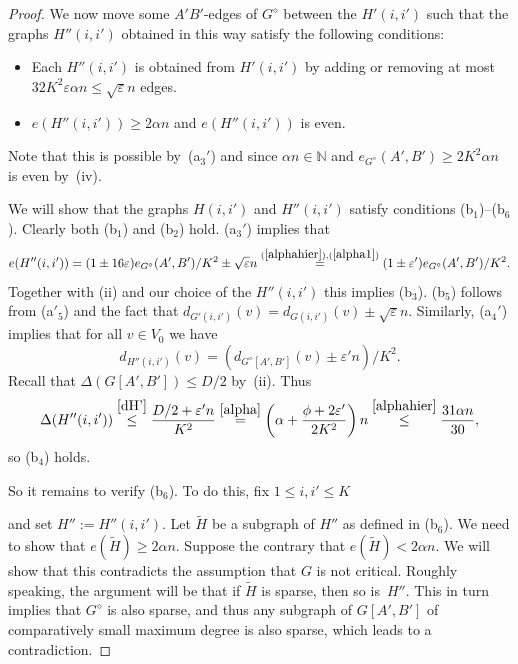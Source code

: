 \documentclass{memo-l}
\def\COMMENT#1{}
\def\eps{\varepsilon}
\numberwithin{section}{chapter}
\numberwithin{equation}{section}
\numberwithin{firstthm}{section}
\numberwithin{figure}{section}
\begin{document}
{\begin{proof}
We now move some $A'B'$-edges of $G^\diamond$ between the $H'(i,i')$ such that the graphs $H''(i,i')$
obtained in this way satisfy the following conditions:
\begin{itemize}
\item Each $H''(i,i')$ is obtained from $H'(i,i')$ by adding or removing at most $32K^2 \eps \alpha n\le \sqrt{\eps}n$ edges.
\item $e(H''(i,i'))\ge 2 \alpha n$ and $e(H''(i,i'))$ is even.
\end{itemize}
Note that this is possible by~(a$_3'$) and since $\alpha n\in\mathbb{N}$ and $e_{G^\diamond} (A',B') \geq 2K^2\alpha n$ is even by~(iv).

We will show that the graphs $H(i,i')$ and $H''(i,i')$ satisfy conditions (b$_1$)--(b$_6$).
Clearly both (b$_1$) and (b$_2$) hold.
(a$_3'$) implies that
\begin{equation} \label{eH'}
e(H''(i,i')) = (1\pm 16 \eps) e_{G^{\diamond}}(A',B')/K^2\pm \sqrt{\eps}n \overset{(\ref{alphahier}),(\ref{alpha1}) }{=}
(1\pm \eps') e_{G^{\diamond}}(A',B')/K^2.
\end{equation}
Together with (ii) and our choice of the $H''(i,i')$ this implies (b$_3$). (b$_5$) follows from (a$'_5$)
and the fact that $d_{G'(i,i')}(v )  =d_{G(i,i')}(v ) \pm \sqrt{\eps}n$.
Similarly, (a$_4'$) implies that for all $v \in V_0$ we have
\begin{equation}\label{dH'}
d_{H''(i,i')}(v )  =  ( d_{G^{\diamond} [A',B']}(v)  \pm \eps' n)/{K^2}.
\end{equation}
Recall that $\Delta(G[A',B']) \le D/2$ by~(ii). Thus
$$
	\Delta(H''(i,i'))  \overset{\eqref{dH'}}{\le}   %
\frac{D/2 + \eps' n   }{K^2}   \overset{\eqref{alpha}}{=}  \left( \alpha +  \frac{\phi + 2\eps' }{2K^2} \right) n 
 \overset{\eqref{alphahier}}{\le}  \frac{31 \alpha n }{30},
$$
so (b$_4$) holds.

So it remains to verify (b$_6$). To do this, fix $1 \le i, i' \le K$%
\COMMENT{AL: changed $i,i' \le K$ to  $1 \le i,i' \le K$.}
 and set $H'' :=H''(i,i')$.
Let $\widetilde{H}$ be a subgraph of $H''$ as defined in (b$_6$). We need to show that $e(\widetilde{H}) \ge 2 \alpha n$.
Suppose the contrary that $e(\widetilde{H}) < 2 \alpha n$.
We will show that this contradicts the assumption that $G$ is not critical.
Roughly speaking, the argument will be that if $\widetilde{H}$ is sparse, then so is~$H''$.
This in turn implies that $G^\diamond$ is also sparse, and thus any subgraph of $G[A',B']$ of comparatively small maximum degree is also sparse, 
which leads to a contradiction.


\end{proof}}
\end{document}
